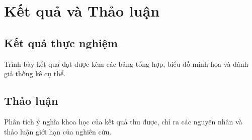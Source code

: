 
\chapter{Kết quả và Thảo luận}\label{ch:ket_qua}

\startcontents[chapters]

\section{Kết quả thực nghiệm}\label{sec:ch04_ket_qua}

Trình bày kết quả đạt được kèm các bảng tổng hợp, biểu đồ minh họa và đánh giá thống kê cụ thể.

\section{Thảo luận}\label{sec:ch04_thao_luan}

Phân tích ý nghĩa khoa học của kết quả thu được, chỉ ra các nguyên nhân và thảo luận giới hạn của nghiên cứu.
